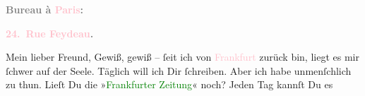            \pstart
           \begin{otherlanguage}{french}\textcolor{gray}{\textbf{\textbf{Bureau à \textcolor{pink}{Paris}{}\ledrightnote{\textcolor{pink}{Paris}}:}}}\end{otherlanguage}\pend
           \pstart
           \begin{otherlanguage}{french}\textcolor{gray}{\textbf{\textbf{\textcolor{pink}{24. Rue Feydeau}{}\ledrightnote{\textcolor{pink}{rue Feydeau}}.}}}\end{otherlanguage}\pend
           \pstart\center{}Mein lieber Freund,\pend\pstart
           Gewiß, gewiß – ſeit ich von \textcolor{pink}{Frankfurt}{}\ledrightnote{\textcolor{pink}{Frankfurt am Main}} zurück bin,
               liegt es mir ſchwer auf der Seele. Täglich will ich Dir ſchreiben. Aber ich habe
               unmenſchlich zu thun.  Lieſt Du die »\textcolor{green}{Frankfurter Zeitung}{}\ledrightnote{\textcolor{green}{Frankfurter Zeitung}}« noch? Jeden Tag kannſt Du es

